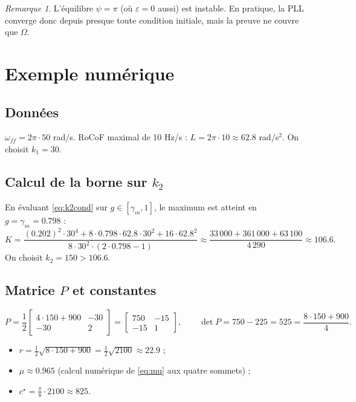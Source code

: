 \documentclass[11pt,a4paper]{article}
\numberwithin{equation}{section}
\theoremstyle{plain}
\theoremstyle{definition}
\theoremstyle{remark}
\newtheorem{remarque}[theoreme]{Remarque}
\newcommand{\wff}{\omega_{ff}}
\begin{document}
\begin{remarque}
L'équilibre $\psi=\pi$ (où $\varepsilon=0$ aussi) est instable. En pratique, la PLL converge donc
depuis presque toute condition initiale, mais la preuve ne couvre que $\Omega$.
\end{remarque}

\section{Exemple numérique}

\subsection{Données}
$\wff=2\pi\cdot50$ rad/s. RoCoF maximal de 10 Hz/s : $L=2\pi\cdot10\approx62.8$ rad/s$^2$.
On choisit $k_1=30$.

\subsection{Calcul de la borne sur $k_2$}
En évaluant \eqref{eq:k2cond} sur $g\in[\gamma_m,1]$, le maximum est atteint en $g=\gamma_m=0.798$ :
\begin{equation}
K = \frac{(0.202)^2\cdot30^4 + 8\cdot0.798\cdot62.8\cdot30^2 + 16\cdot62.8^2}{8\cdot30^2\cdot(2\cdot0.798-1)}
\approx\frac{33\,000+361\,000+63\,100}{4\,290}\approx106.6 .
\end{equation}
On choisit $k_2=150>106.6$. \checkmark

\subsection{Matrice $P$ et constantes}
\begin{equation}
P=\frac12\begin{bmatrix}4\cdot150+900&-30\\-30&2\end{bmatrix}=\begin{bmatrix}750&-15\\-15&1\end{bmatrix},
\qquad \det P = 750-225 = 525 = \frac{8\cdot150+900}{4}.
\end{equation}
\begin{itemize}
  \item $r = \frac12\sqrt{8\cdot150+900} = \frac12\sqrt{2100}\approx22.9$ ;
  \item $\mu\approx0.965$ (calcul numérique de \eqref{eq:mu} aux quatre sommets) ;
  \item $c^\star = \frac{\pi}{8}\cdot2100\approx825$.
\end{itemize}
\end{document}
